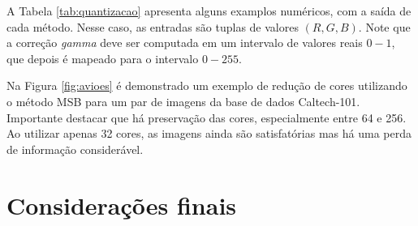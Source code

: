 A Tabela \ref{tab:quantizacao} apresenta alguns examplos numéricos, com a saída de cada método. Nesse caso, as entradas são tuplas de valores $(R, G, B)$. Note que a correção \textit{gamma} deve ser computada em um intervalo de valores reais $0-1$, que depois é mapeado para o intervalo $0-255$.

Na Figura \ref{fig:avioes} é demonstrado um exemplo de redução de cores utilizando o método MSB para um par de imagens da base de dados Caltech-101. Importante destacar que há preservação das cores, especialmente entre 64 e 256. Ao utilizar apenas 32 cores, as imagens ainda são satisfatórias mas há uma perda de informação considerável. 

\section{Considerações finais}
